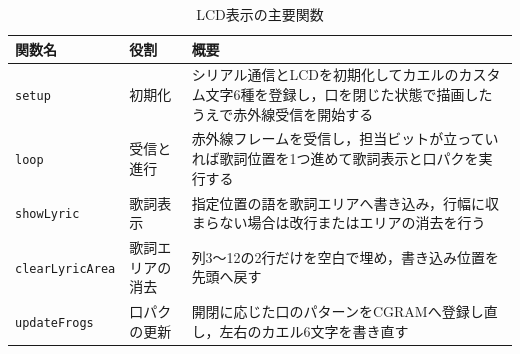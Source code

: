 \begin{table}[tb]
\caption{LCD表示の主要関数}
\label{tab:lcd_func}
\begin{center}
\small
\begin{tabular}{llp{}}
\hline
関数名 & 役割 & 概要 \\
\hline
\texttt{setup} & 初期化 & シリアル通信とLCDを初期化してカエルのカスタム文字6種を登録し，口を閉じた状態で描画したうえで赤外線受信を開始する \\
\texttt{loop} & 受信と進行 & 赤外線フレームを受信し，担当ビットが立っていれば歌詞位置を1つ進めて歌詞表示と口パクを実行する \\
\texttt{showLyric} & 歌詞表示 & 指定位置の語を歌詞エリアへ書き込み，行幅に収まらない場合は改行またはエリアの消去を行う \\
\texttt{clearLyricArea} & 歌詞エリアの消去 & 列3〜12の2行だけを空白で埋め，書き込み位置を先頭へ戻す \\
\texttt{updateFrogs} & 口パクの更新 & 開閉に応じた口のパターンをCGRAMへ登録し直し，左右のカエル6文字を書き直す \\
\hline
\end{tabular}
\end{center}
\end{table}

